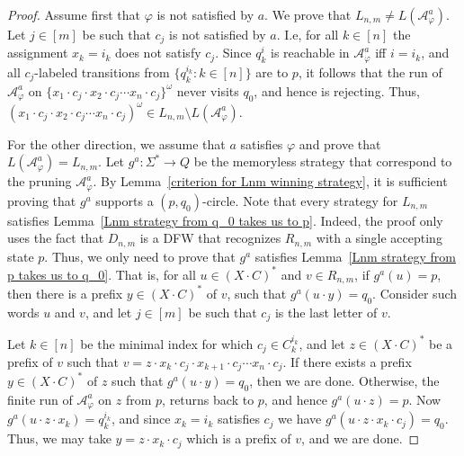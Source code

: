 \documentclass[10pt,a4paper]{amsart}
\theoremstyle{definition}
\numberwithin{equation}{section}
\newcommand{\A}{{\mathcal A}}
\begin{document}
\begin{proof}
	Assume first that $\varphi$ is not satisfied by $a$. We prove that $L_{n,m}\neq L(\A^{a}_\varphi)$. Let $j\in [m]$ be such that $c_j$ is not satisfied by $a$. I.e, for all $k\in [n]$ the assignment $x_k=i_k$ does not satisfy $c_j$. Since $q^i_k$ is reachable in $\A_\varphi^{a}$ iff $i=i_k$, and all $c_j$-labeled transitions from $\{q^{i_k}_k : k\in[n]\}$ are to $p$, it follows that the run of $\A_\varphi^{a}$ on $\{x_1\cdot c_j\cdot x_2\cdot c_j\cdots x_n\cdot c_j\}^\omega$ never visits $q_0$, and hence is rejecting. Thus, $(x_1\cdot c_j\cdot x_2\cdot c_j\cdots x_n\cdot c_j)^\omega\in L_{n,m}\setminus L(\A_\varphi^{a})$.
	
	For the other direction, we assume that $a$ satisfies $\varphi$ and prove that $L(\A_\varphi^{a})=L_{n,m}$. Let $g^{a}:\Sigma^*\rightarrow Q$ be the memoryless strategy that correspond to the pruning $\A^{a}_\varphi$. By Lemma~\ref{criterion for Lnm winning strategy}, it is sufficient proving that $g^a$ supports a $(p,q_0)$-circle. Note that every strategy for $L_{n,m}$ satisfies Lemma~\ref{Lnm strategy from q_0 takes us to p}. Indeed, the proof only uses the fact that $D_{n,m}$ is a DFW that recognizes $R_{n,m}$ with a single accepting state $p$. Thus, we only need to prove that $g^a$ satisfies Lemma~\ref{Lnm strategy from p takes us to q_0}. That is, for all $u\in (X\cdot C)^*$ and $v\in R_{n,m}$, if $g^{a}(u)=p$, then there is a prefix $y\in (X\cdot C)^*$ of $v$, such that $g^{a}(u\cdot y)=q_0$. Consider such words $u$ and $v$, and let $j\in [m]$ be such that $c_j$ is the last letter of $v$. 
	
		Let $ k\in [n]$ be the minimal index for which $c_j\in C^{i_k}_k$, 
	and let $z\in (X\cdot C)^*$ be a prefix of $v$ such that $v=z\cdot x_k\cdot c_j\cdot x_{k+1}\cdot c_j\cdots x_n\cdot c_j$. If there exists a prefix $y\in (X\cdot C)^*$ of $ z$ such that $g^{a}(u\cdot y)=q_0$, then we are done. Otherwise, the finite run of $\A_\varphi^{a}$ on $ z $ from $ p $, returns back to $ p $, and hence $g^{a}(u\cdot z)=p$. Now $g^{a}(u\cdot z\cdot x_k)=q^{i_k}_k$, and since $x_k=i_k$ satisfies $c_j$ we have $g^{a}(u\cdot z\cdot x_k\cdot c_j)=q_0$. Thus, we may take $y=z\cdot x_k\cdot c_j$ which is a prefix of $v$, and we are done.
\end{proof}


 
\end{document}
